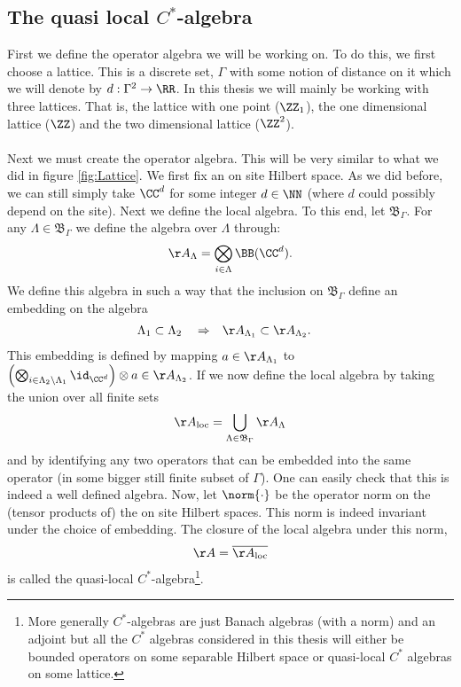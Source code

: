 \subsection{The quasi local $C^*$-algebra}
First we define the operator algebra we will be working on. To do this, we first choose a lattice. This is a discrete set, $\Gamma$ with some notion of distance on it which we will denote by $d:\Gamma^2\rightarrow \RR$. In this thesis we will mainly be working with three lattices. That is, the lattice with one point ($\ZZ_1$), the one dimensional lattice ($\ZZ$) and the two dimensional lattice ($\ZZ^2$).\\\\
Next we must create the operator algebra. This will be very similar to what we did in figure \ref{fig:Lattice}. We first fix an on site Hilbert space. As we did before, we can still simply take $\CC^d$ for some integer $d\in\NN$ (where $d$ could possibly depend on the site). Next we define the local algebra. To this end, let $\mathfrak{B}_{\Gamma}$. For any $\Lambda\in\mathfrak{B}_\Gamma$ we define the algebra over $\Lambda$ through:
\begin{equation}
	\AA_{\Lambda}=\bigotimes_{i\in\Lambda}\BB(\CC^d).
\end{equation}
We define this algebra in such a way that the inclusion on $\mathfrak{B}_\Gamma$ define an embedding on the algebra
\begin{align}
	\Lambda_1&\subset\Lambda_2&&\Rightarrow&\AA_{\Lambda_1}&\subset\AA_{\Lambda_2}.
\end{align}
This embedding is defined by mapping $a\in\AA_{\Lambda_1}$ to $\left(\bigotimes_{i\in\Lambda_2\backslash\Lambda_1}\id_{\CC^d}\right)\otimes a\in \AA_{\Lambda_2}$. If we now define the local algebra by taking the union over all finite sets
\begin{equation}
	\AA_{\text{loc}}=\bigcup_{\Lambda\in\mathfrak{B}_\Gamma}\AA_\Lambda
\end{equation}
and by identifying any two operators that can be embedded into the same operator (in some bigger still finite subset of $\Gamma$). One can easily check that this is indeed a well defined algebra. Now, let $\norm{\cdot}$ be the operator norm on the (tensor products of) the on site Hilbert spaces. This norm is indeed invariant under the choice of embedding. The closure of the local algebra under this norm,
\begin{equation}
	\AA=\overline{\AA_{\text{loc}}}
\end{equation}
is called the quasi-local $C^*$-algebra\footnote{More generally $C^*$-algebras are just Banach algebras (with a norm) and an adjoint but all the $C^*$ algebras considered in this thesis will either be bounded operators on some separable Hilbert space or quasi-local $C^*$ algebras on some lattice.}.
